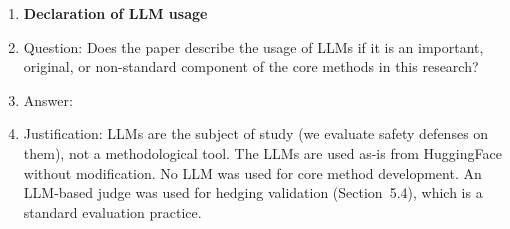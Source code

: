 \begin{enumerate}
\item {\bf Declaration of LLM usage}
    \item[] Question: Does the paper describe the usage of LLMs if it is an important, original, or non-standard component of the core methods in this research?
    \item[] Answer: \answerNA{}
    \item[] Justification: LLMs are the subject of study (we evaluate safety defenses on them), not a methodological tool. The LLMs are used as-is from HuggingFace without modification. No LLM was used for core method development. An LLM-based judge was used for hedging validation (Section~5.4), which is a standard evaluation practice.

\end{enumerate}
